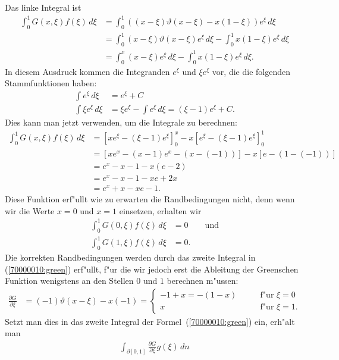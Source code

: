 \begin{loesung}
Das linke Integral ist
\begin{align*}
\int_0^1 G(x,\xi) f(\xi)\,d\xi
&=
\int_0^1 ( (x-\xi)\vartheta(x-\xi) -x(1-\xi)) e^{\xi} \,d\xi
\\
&=
\int_0^1 (x-\xi)\vartheta(x-\xi) e^{\xi} \,d\xi
-
\int_0^1 x(1-\xi) e^{\xi} \,d\xi
\\
&=
\int_0^x (x-\xi) e^{\xi} \,d\xi
-
\int_0^1 x(1-\xi) e^{\xi} \,d\xi.
\end{align*}
In diesem Ausdruck kommen die Integranden $e^\xi$ und $\xi e^\xi$ vor,
die die folgenden Stammfunktionen haben:
\begin{align*}
\int e^\xi\,d\xi&=e^\xi + C\\
\int \xi e^\xi\,d\xi&=\xi e^\xi - \int e^\xi\,d\xi = (\xi - 1)e^\xi + C.
\end{align*}
Dies kann man jetzt verwenden, um die Integrale zu berechnen:
\begin{align*}
\int_0^1 G(x,\xi) f(\xi)\,d\xi
&=
\left[
xe^\xi -(\xi - 1)e^\xi
\right]_0^x
-
x\left[
e^\xi-(\xi - 1)e^\xi
\right]_0^1
\\
&=
\left[
xe^x-(x-1)e^x
-
(x-(-1))
\right]
-
x
\left[
e - (1-(-1))
\right]
\\
&=
e^x-x-1
-
x(e-2)
\\
&=
e^x-x-1
-xe+2x
\\
&=
e^x+x-xe-1.
\end{align*}
Diese Funktion erf"ullt wie zu erwarten die Randbedingungen nicht, denn
wenn wir die Werte $x=0$ und $x=1$ einsetzen, erhalten wir
\begin{align*}
\int_0^1 G(0,\xi) f(\xi)\,d\xi
&=0\qquad\text{und}
\\
\int_0^1 G(1,\xi) f(\xi)\,d\xi
&=0.
\end{align*}
Die korrekten Randbedingungen werden durch das zweite Integral in
(\ref{70000010:green}) erf"ullt, f"ur die wir jedoch erst die
Ableitung der Greenschen Funktion wenigstens an den Stellen $0$ und $1$
berechnen m"ussen:
\begin{align*}
\frac{\partial G}{\partial\xi}
&=(-1)\vartheta(x-\xi) - x(-1)
=\begin{cases}
-1+x=-(1-x)
\qquad&\text{f"ur $\xi=0$}
\\
x
\qquad&\text{f"ur $\xi=1$.}
\end{cases}
\end{align*}
Setzt man dies in das zweite Integral der Formel~(\ref{70000010:green}) ein,
erh"alt man
\begin{align*}
\int_{\partial[0,1]}\frac{\partial G}{\partial \xi} g(\xi)\,dn

\end{align*}
\end{loesung}
